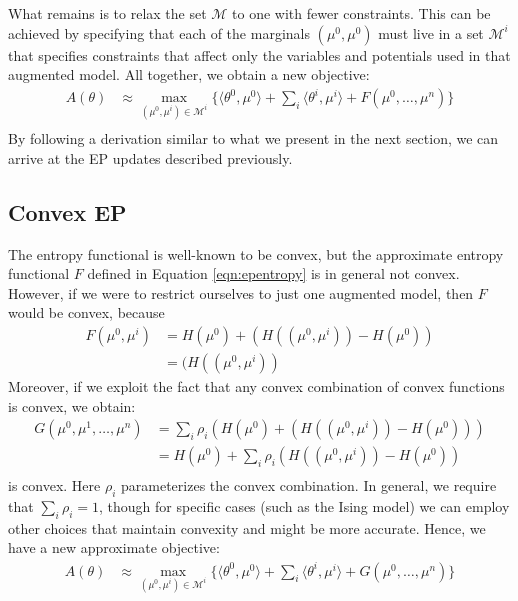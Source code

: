\documentclass[times, 10pt,twocolumn]{article}
\begin{document}
What remains is to relax the set $\mathcal M$ to one with fewer
constraints. This can be achieved by specifying that each of the
marginals $(\mu^0,\mu^0)$ must live in a set $\mathcal M^i$ that
specifies constraints that affect only the variables and potentials
used in that augmented model. All together, we obtain a new
objective:
\begin{equation}
  \begin{split}
     A(\theta) 
     &\approx \max_{(\mu^0,\mu^i) \in \mathcal{M}^i} \{ \langle
     \theta^0, \mu^0 \rangle + \sum_i \langle\theta^i,\mu^i\rangle +F(\mu^0, \ldots, \mu^n) \} \\
   \end{split}
 \end{equation}
By following a derivation similar to what we present in the
next section, we can arrive at the EP updates described previously.

\subsection{Convex EP}

The entropy functional is well-known to be convex, but
the approximate entropy functional $F$ defined in Equation
\ref{eqn:epentropy} is in general not
convex\cite{wainwright08graphical}.
However, if we were to restrict ourselves to just one augmented
model, then $F$ would be convex, because
\begin{equation}
  \begin{split}
     F(\mu^0,\mu^i) &= H(\mu^0) + \left( H( (\mu^0, \mu^i)) -
     H(\mu^0) \right ) \\
     &= ( H( (\mu^0, \mu^i)) 
   \end{split}
 \end{equation}
Moreover, if we exploit the fact that any convex combination of
convex functions is convex, we obtain:
\begin{equation}
  \begin{split}
     G(\mu^0,\mu^1,\ldots,\mu^n) &= \sum_i \rho_i \left ( H(\mu^0) + \left( H( (\mu^0, \mu^i)) - H(\mu^0) \right ) \right ) \\
     &= H(\mu^0) + \sum_i \rho_i \left( H( (\mu^0, \mu^i)) - H(\mu^0) \right )  \\
   \end{split}
 \end{equation}
is convex. Here $\rho_i$ parameterizes the convex combination. In
general, we require that $\sum_i \rho_i = 1$, though for specific
cases (such as the Ising model) we can employ other choices that
maintain convexity and might be more accurate. Hence, we have a new
approximate objective:
\begin{equation}
  \begin{split}
     A(\theta) 
     &\approx \max_{(\mu^0,\mu^i) \in \mathcal{M}^i} \{
     \langle\theta^0,\mu^0\rangle + \sum_i \langle
     \theta^i,\mu^i\rangle  +G(\mu^0, \ldots, \mu^n) \} \\
   \end{split}
 \end{equation}
\end{document}
